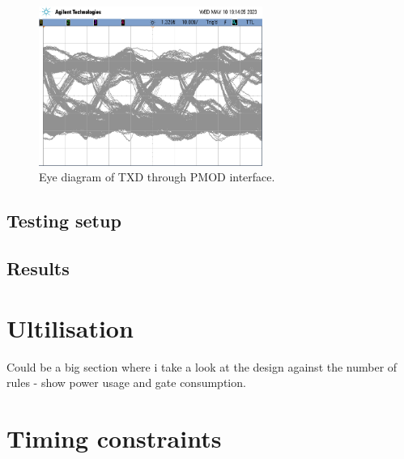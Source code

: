 \begin{figure}[h]
    \centering
    \includegraphics[width=0.65\textwidth]{Images/EyeDiagramTX.png}
    \caption[Eye diagram of TXD through PMOD interface]{Eye diagram of TXD through PMOD interface.}
    \label{fig:eye_diagram}
\end{figure}


\subsection{Testing setup}

\subsection{Results}



\section{Ultilisation}

Could be a big section where i take a look at the design against the number of rules - show power usage and gate consumption.


\section{Timing constraints}
\label{sec:timing_constraints}